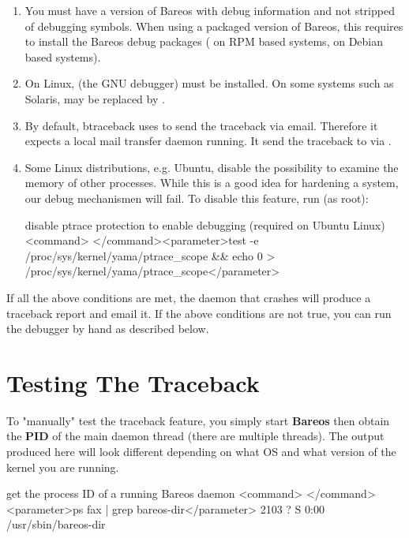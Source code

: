 \begin{enumerate}
\item You must have a version of Bareos with debug information and not stripped of debugging symbols.
  When using a packaged version of Bareos, this requires to install the Bareos debug packages 
  ( on RPM based systems,  on Debian based systems).

\item On Linux,  (the GNU debugger) must be installed. 
   On some systems such as Solaris,  may be replaced by .

\item By default, btraceback uses  to send the traceback via email.
   Therefore it expects a local mail transfer daemon running. 
   It send the traceback to  via .

\item Some Linux distributions, e.g. Ubuntu, 
    disable the possibility to examine the memory of other processes.
    While this is a good idea for hardening a system, our debug mechanismen will fail.
    To disable this feature, run (as root):
\begin{commands}{disable ptrace protection to enable debugging (required on Ubuntu Linux)}
<command> </command><parameter>test -e /proc/sys/kernel/yama/ptrace_scope && echo 0 > /proc/sys/kernel/yama/ptrace_scope</parameter>
\end{commands}
 
\end{enumerate}

If all the above conditions are met, the daemon that crashes will produce a
traceback report and email it. If the above conditions are not true,
you can run the debugger by hand as described below.

\section{Testing The Traceback}

To "manually" test the traceback feature, you simply start {\bf Bareos} then
obtain the {\bf PID} of the main daemon thread (there are multiple threads).
The output produced here will look different depending on what OS and what
version of the kernel you are running.

\begin{commands}{get the process ID of a running Bareos daemon}
<command> </command><parameter>ps fax | grep bareos-dir</parameter>
 2103 ?        S      0:00 /usr/sbin/bareos-dir
\end{commands}


